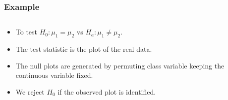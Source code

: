 \documentclass{beamer}
\begin{document}
\begin{frame}
  \frametitle{Example}
  
	\begin{columns}
	
		\begin{column}{0.4\textwidth}
		  \begin{itemize}
			  \item To test $H_0: \mu_1 = \mu_2$ vs $H_a: \mu_1 \ne \mu_2.$
			  \item The test statistic is the plot of the real data.
			  \item The null plots are generated by permuting class variable keeping the continuous variable fixed.			
			    \item We reject $H_0$ if the observed plot is identified.		
		 \end{itemize}		
		\end{column}
		
		\begin{column}{0.6\textwidth}
			 \begin{center}  \end{center}
		\end{column}
		
	\end{columns} 
	
\end{frame}
\end{document}
